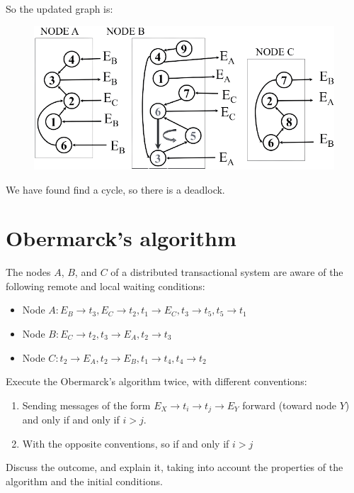 \documentclass[12pt, a4paper]{report}
\begin{document}
        So the updated graph is: 
        \begin{figure}[H]
            \centering
            \includegraphics[width=0.75\linewidth]{images/Ob3.png}
        \end{figure}
        We have found find a cycle, so there is a deadlock. 

    \newpage

    \section{Obermarck's algorithm}
        The nodes $A$, $B$, and $C$ of a distributed transactional system are aware of the following remote and local waiting conditions:
        \begin{itemize}
            \item Node $A: E_B \rightarrow t_3, E_C \rightarrow t_2, t_1 \rightarrow E_C, t_3 \rightarrow t_5, t_5 \rightarrow t_1$
            \item Node $B: E_C \rightarrow t_2, t_3 \rightarrow E_A, t_2 \rightarrow t_3$
            \item Node $C: t_2 \rightarrow E_A, t_2 \rightarrow E_B, t_1 \rightarrow t_4, t_4 \rightarrow t_2$
        \end{itemize}
        Execute the Obermarck's algorithm twice, with different conventions:
        \begin{enumerate}
            \item Sending messages of the form $E_X \rightarrow t_i \rightarrow t_j \rightarrow E_Y$ forward (toward node $Y$) and only 
                if and only if $i > j$. 
            \item With the opposite conventions, so if and only if $i > j$
        \end{enumerate}
        Discuss the outcome, and explain it, taking into account the properties of the algorithm and the initial conditions.
\end{document}
